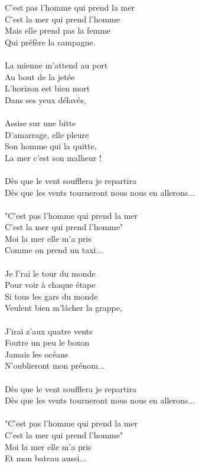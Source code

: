 C'est pas l'homme qui prend la mer\\
C'est la mer qui prend l'homme\\
Mais elle prend pas la femme\\
Qui préfère la campagne.\\\\
La mienne m'attend au port\\
Au bout de la jetée\\
L'horizon est bien mort\\
Dans ses yeux délavés,\\\\
Assise sur une bitte\\
D'amarrage, elle pleure\\
Son homme qui la quitte,\\
La mer c'est son malheur !\\\\
Dès que le vent soufflera je repartira\\
Dès que les vents tourneront nous nous en allerons...\\\\
"C'est pas l'homme qui prend la mer\\
C'est la mer qui prend l'homme"\\
Moi la mer elle m'a pris\\
Comme on prend un taxi...\\\\
Je f'rai le tour du monde\\
Pour voir à chaque étape\\
Si tous les gars du monde\\
Veulent bien m'lâcher la grappe,\\\\
J'irai z'aux quatre vents\\
Foutre un peu le boxon\\
Jamais les océans\\
N'oublieront mon prénom...\\\\
Dès que le vent soufflera je repartira\\
Dès que les vents tourneront nous nous en allerons...\\\\
"C'est pas l'homme qui prend la mer\\
C'est la mer qui prend l'homme"\\
Moi la mer elle m'a pris\\
Et mon bateau aussi...\\\\
